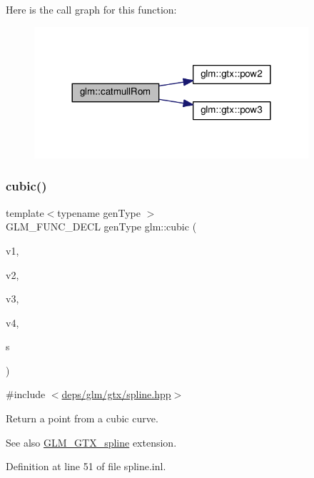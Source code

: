 Here is the call graph for this function\+:
\nopagebreak
\begin{figure}[H]
\begin{center}
\leavevmode
\includegraphics[width=288pt]{d7/d53/group__gtx__spline_ga8119c04f8210fd0d292757565cd6918d_cgraph}
\end{center}
\end{figure}
\mbox{\label{group__gtx__spline_ga6b867eb52e2fc933d2e0bf26aabc9a70}} 
\subsubsection{\texorpdfstring{cubic()}{cubic()}}
{\footnotesize\ttfamily template$<$typename gen\+Type $>$ \\
G\+L\+M\+\_\+\+F\+U\+N\+C\+\_\+\+D\+E\+CL gen\+Type glm\+::cubic (\begin{DoxyParamCaption}\item[{gen\+Type const \&}]{v1,  }\item[{gen\+Type const \&}]{v2,  }\item[{gen\+Type const \&}]{v3,  }\item[{gen\+Type const \&}]{v4,  }\item[{typename gen\+Type\+::value\+\_\+type const \&}]{s }\end{DoxyParamCaption})}



{\ttfamily \#include $<$\hyperlink{spline_8hpp}{deps/glm/gtx/spline.\+hpp}$>$}

Return a point from a cubic curve. \begin{DoxySeeAlso}{See also}
\hyperlink{group__gtx__spline}{G\+L\+M\+\_\+\+G\+T\+X\+\_\+spline} extension. 
\end{DoxySeeAlso}


Definition at line 51 of file spline.\+inl.

